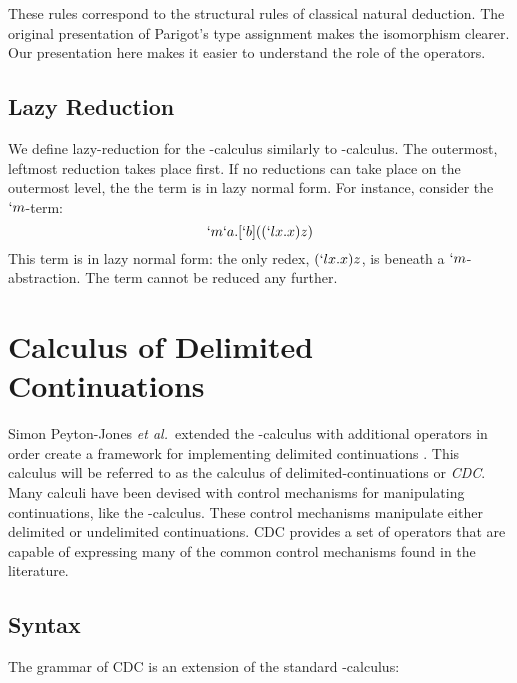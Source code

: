   
  These rules correspond to the structural rules of classical natural deduction.
  The original presentation of Parigot's type assignment makes the isomorphism clearer.
  Our presentation here makes it easier to understand the role of the operators.
  
  \subsection{Lazy Reduction}
  We define lazy-reduction for the \lmu-calculus similarly to \lam-calculus.
  The outermost, leftmost reduction takes place first. 
  If no reductions can take place on the outermost level, the the term is in lazy normal form.
  For instance, consider the $`m$-term:
  \[
    `m`a.[`b]((`lx.x)z)
  \]
  This term is in lazy normal form: the only redex, $(`lx.x)z$, is beneath a $`m$-abstraction.
  The term cannot be reduced any further.

\section{Calculus of Delimited Continuations}

  Simon Peyton-Jones \textit{et al.}\ extended the \lam-calculus with additional operators in order create a framework for implementing delimited continuations \cite{JonesDS07}. 
  This calculus will be referred to as the calculus of delimited-continuations or \emph{CDC}. 
  Many calculi have been devised with control mechanisms for manipulating continuations, like the \lmu-calculus.
  These control mechanisms manipulate either delimited or undelimited continuations. 
  CDC provides a set of operators that are capable of expressing many of the common control mechanisms found in the literature.

  \subsection{Syntax}
  The grammar of CDC is an extension of the standard \lam-calculus:

